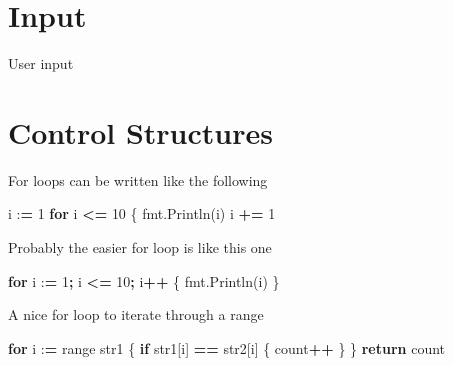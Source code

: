 \documentclass[]{book}
\newenvironment{Shaded}{\begin{snugshade}}{\end{snugshade}}
\newcommand{\DecValTok}[1]{\textcolor[rgb]{0.00,0.00,0.81}{#1}}
\newcommand{\SpecialCharTok}[1]{\textcolor[rgb]{0.00,0.00,0.00}{#1}}
\newcommand{\StringTok}[1]{\textcolor[rgb]{0.31,0.60,0.02}{#1}}
\newcommand{\ControlFlowTok}[1]{\textcolor[rgb]{0.13,0.29,0.53}{\textbf{#1}}}
\newcommand{\OperatorTok}[1]{\textcolor[rgb]{0.81,0.36,0.00}{\textbf{#1}}}
\newcommand{\BuiltInTok}[1]{#1}
\newcommand{\NormalTok}[1]{#1}
\begin{document}
\section{Input}\label{input}

User input

\begin{Shaded}
\end{Shaded}

\section{Control Structures}\label{control-structures}

For loops can be written like the following

\begin{Shaded}
\begin{Highlighting}[]
\NormalTok{i :}\OperatorTok{=} \DecValTok{1}
\ControlFlowTok{for}\NormalTok{ i }\OperatorTok{<=} \DecValTok{10}\NormalTok{ \{}
\NormalTok{    fmt.Println(i)}
\NormalTok{    i }\OperatorTok{+=} \DecValTok{1}
\end{Highlighting}
\end{Shaded}

Probably the easier for loop is like this one

\begin{Shaded}
\begin{Highlighting}[]
\ControlFlowTok{for}\NormalTok{ i :}\OperatorTok{=} \DecValTok{1}\OperatorTok{;}\NormalTok{ i }\OperatorTok{<=} \DecValTok{10}\OperatorTok{;}\NormalTok{ i}\OperatorTok{++}\NormalTok{ \{}
\NormalTok{    fmt.Println(i)}
\NormalTok{\}}
\end{Highlighting}
\end{Shaded}

A nice for loop to iterate through a range

\begin{Shaded}
\begin{Highlighting}[]
\ControlFlowTok{for}\NormalTok{ i :}\OperatorTok{=} \BuiltInTok{range}\NormalTok{ str1 \{}
    \ControlFlowTok{if}\NormalTok{ str1[i] }\OperatorTok{==}\NormalTok{ str2[i] \{ count}\OperatorTok{++}\NormalTok{ \}}
\NormalTok{\}}
\ControlFlowTok{return}\NormalTok{ count}
\end{Highlighting}
\end{Shaded}
\end{document}
